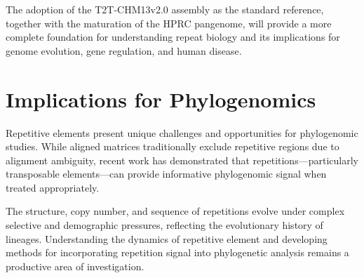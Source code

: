 The adoption of the T2T-CHM13v2.0 assembly as the standard reference, together with the maturation of the HPRC pangenome, will provide a more complete foundation for understanding repeat biology and its implications for genome evolution, gene regulation, and human disease.

\section{Implications for Phylogenomics}

Repetitive elements present unique challenges and opportunities for phylogenomic studies. While aligned matrices traditionally exclude repetitive regions due to alignment ambiguity, recent work has demonstrated that repetitions---particularly transposable elements---can provide informative phylogenomic signal when treated appropriately.

The structure, copy number, and sequence of repetitions evolve under complex selective and demographic pressures, reflecting the evolutionary history of lineages. Understanding the dynamics of repetitive element and developing methods for incorporating repetition signal into phylogenetic analysis remains a productive area of investigation.


